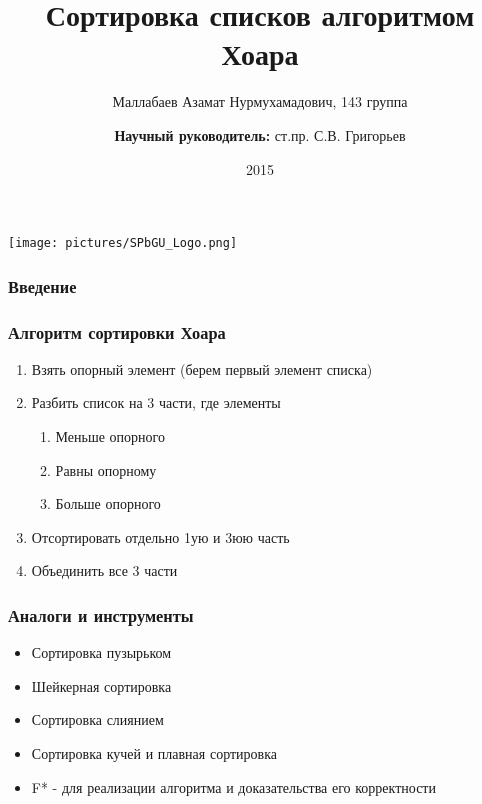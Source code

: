 \documentclass{beamer}
\title[]{Сортировка списков алгоритмом Хоара}
\institute[СПбГУ]{
Санкт-Петербургский государственный университет }
\author[Маллабаев Азамат]{Маллабаев Азамат Нурмухамадович, 143 группа \\
  \and
    {\bfseries Научный руководитель:} ст.пр. С.В. Григорьев \\
  }
\date{2015}
\begin{document}
{
\begin{frame}
  \begin{center}
  {\texttt{[image: pictures/SPbGU\_Logo.png]}}
  \end{center}
  \titlepage
\end{frame}
}

\begin{frame}[fragile]
  \transwipe[direction=90]
  \frametitle{Введение}
\end{frame}

\begin{frame}
  \transwipe[direction=90]
  \frametitle{Алгоритм сортировки Хоара}
  \begin{enumerate}
    \item Взять опорный элемент (берем первый элемент списка)
    \item Разбить список на 3 части, где элементы
    \begin{enumerate}
      \item Меньше опорного
      \item Равны опорному
      \item Больше опорного
    \end{enumerate}
    \item Отсортировать отдельно 1ую и 3юю часть
    \item Объединить все 3 части
  \end{enumerate}
\end{frame}

\begin{frame}
  \transwipe[direction=90]
  \frametitle{Аналоги и инструменты}
  \begin{itemize}
    \item Сортировка пузырьком
    \item Шейкерная сортировка
    \item Сортировка слиянием
    \item Сортировка кучей и плавная сортировка
  \end{itemize}
  \begin{itemize}
    \item F* - для реализации алгоритма и доказательства его корректности
  \end{itemize}
\end{frame}
\end{document}
